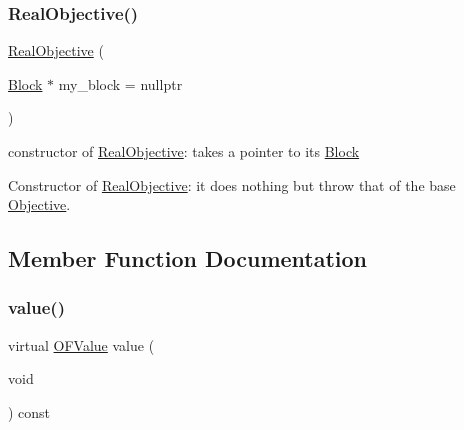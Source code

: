 \subsubsection{\texorpdfstring{Real\+Objective()}{RealObjective()}}
{\footnotesize\ttfamily \mbox{\hyperlink{class_s_m_spp__di__unipi__it_1_1_real_objective}{Real\+Objective}} (\begin{DoxyParamCaption}\item[{\mbox{\hyperlink{class_s_m_spp__di__unipi__it_1_1_block}{Block}} $\ast$}]{my\+\_\+block = {\ttfamily nullptr} }\end{DoxyParamCaption})\hspace{0.3cm}{\ttfamily [inline]}}



constructor of \mbox{\hyperlink{class_s_m_spp__di__unipi__it_1_1_real_objective}{Real\+Objective}}\+: takes a pointer to its \mbox{\hyperlink{class_s_m_spp__di__unipi__it_1_1_block}{Block}} 

Constructor of \mbox{\hyperlink{class_s_m_spp__di__unipi__it_1_1_real_objective}{Real\+Objective}}\+: it does nothing but throw that of the base \mbox{\hyperlink{class_s_m_spp__di__unipi__it_1_1_objective}{Objective}}. 

\subsection{Member Function Documentation}
\mbox{\label{class_s_m_spp__di__unipi__it_1_1_real_objective_a0f22975a7eb12dac66b8c31ec72ac13e}} 
\subsubsection{\texorpdfstring{value()}{value()}}
{\footnotesize\ttfamily virtual \mbox{\hyperlink{class_s_m_spp__di__unipi__it_1_1_real_objective_ab8ce6bff9c21fdcd41e355167209301a}{O\+F\+Value}} value (\begin{DoxyParamCaption}\item[{void}]{ }\end{DoxyParamCaption}) const\hspace{0.3cm}{\ttfamily [pure virtual]}}



